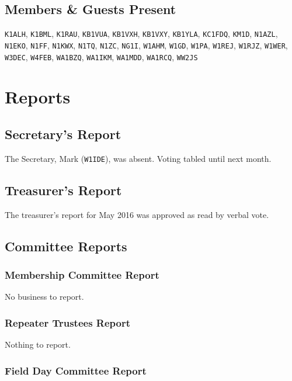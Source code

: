 \documentclass[10pt,letterpaper]{article}
\begin{document}
\subsection{Members \& Guests Present}

\texttt{K1ALH}, \texttt{K1BML}, \texttt{K1RAU}, \texttt{KB1VUA}, \texttt{KB1VXH}, \texttt{KB1VXY}, \texttt{KB1YLA}, \texttt{KC1FDQ}, \texttt{KM1D}, \texttt{N1AZL}, \texttt{N1EKO}, \texttt{N1FF}, \texttt{N1KWX}, \texttt{N1TQ}, \texttt{N1ZC}, \texttt{NG1I}, \texttt{W1AHM}, \texttt{W1GD}, \texttt{W1PA}, \texttt{W1REJ}, \texttt{W1RJZ}, \texttt{W1WER}, \texttt{W3DEC}, \texttt{W4FEB}, \texttt{WA1BZQ}, \texttt{WA1IKM}, \texttt{WA1MDD}, \texttt{WA1RCQ}, \texttt{WW2JS}

\section{Reports}

\subsection{Secretary's Report}

The Secretary, Mark (\texttt{W1IDE}), was absent. Voting tabled until next month.

\newpage
\subsection{Treasurer's Report}

The treasurer's report for May 2016 was approved as read by verbal vote.

\subsection{Committee Reports}

\subsubsection{Membership Committee Report}

No business to report.

\subsubsection{Repeater Trustees Report}

Nothing to report.

\subsubsection{Field Day Committee Report}
\end{document}
